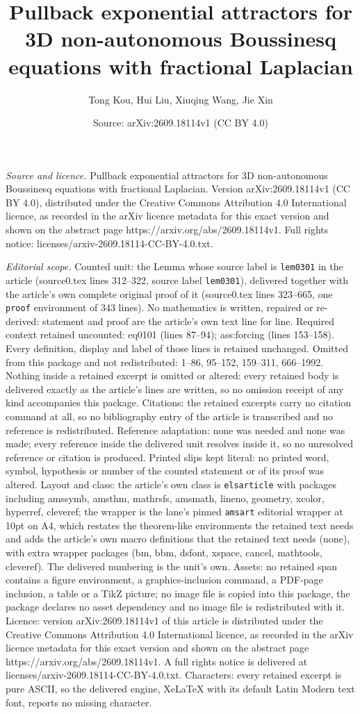 \documentclass[10pt,a4paper]{amsart}
\title[Pullback exponential attractors for 3D non-autonomous Boussi]{Pullback exponential attractors for 3D non-autonomous Boussinesq equations with fractional Laplacian}
\author{Tong Kou, Hui Liu, Xiuqing Wang, Jie Xin}
\date{Source: arXiv:2609.18114v1 (CC BY 4.0)}
\begin{document}
\maketitle

\noindent\emph{Source and licence.} Pullback exponential attractors for 3D non-autonomous Boussinesq equations with fractional Laplacian. Version arXiv:2609.18114v1 (CC BY 4.0), distributed under the Creative Commons Attribution 4.0 International licence, as recorded in the arXiv licence metadata for this exact version and shown on the abstract page https://arxiv.org/abs/2609.18114v1. Full rights notice: licenses/arxiv-2609.18114-CC-BY-4.0.txt.\par\smallskip

\noindent\textit{Editorial scope.} Counted unit: the Lemma whose source label is \texttt{lem0301} in the article (source0.tex lines 312--322, source label \texttt{lem0301}), delivered together with the article's own complete original proof of it (source0.tex lines 323--665, one \texttt{proof} environment of 343 lines). No mathematics is written, repaired or re-derived: statement and proof are the article's own text line for line. Required context retained uncounted: eq0101 (lines 87--94); ass:forcing (lines 153--158). Every definition, display and label of those lines is retained unchanged. Omitted from this package and not redistributed: 1--86, 95--152, 159--311, 666--1992. Nothing inside a retained excerpt is omitted or altered: every retained body is delivered exactly as the article's lines are written, so no omission receipt of any kind accompanies this package. Citations: the retained excerpts carry no citation command at all, so no bibliography entry of the article is transcribed and no reference is redistributed. Reference adaptation: none was needed and none was made; every reference inside the delivered unit resolves inside it, so no unresolved reference or citation is produced. Printed slips kept literal: no printed word, symbol, hypothesis or number of the counted statement or of its proof was altered. Layout and class: the article's own class is \texttt{elsarticle} with packages including amssymb, amsthm, mathrsfs, amsmath, lineno, geometry, xcolor, hyperref, cleveref; the wrapper is the lane's pinned \texttt{amsart} editorial wrapper at 10pt on A4, which restates the theorem-like environments the retained text needs and adds the article's own macro definitions that the retained text needs (none), with extra wrapper packages (bm, bbm, dsfont, xspace, cancel, mathtools, cleveref). The delivered numbering is the unit's own. Assets: no retained span contains a figure environment, a graphics-inclusion command, a PDF-page inclusion, a table or a TikZ picture; no image file is copied into this package, the package declares no asset dependency and no image file is redistributed with it. Licence: version arXiv:2609.18114v1 of this article is distributed under the Creative Commons Attribution 4.0 International licence, as recorded in the arXiv licence metadata for this exact version and shown on the abstract page https://arxiv.org/abs/2609.18114v1. A full rights notice is delivered at licenses/arxiv-2609.18114-CC-BY-4.0.txt. Characters: every retained excerpt is pure ASCII, so the delivered engine, XeLaTeX with its default Latin Modern text font, reports no missing character.
\end{document}

